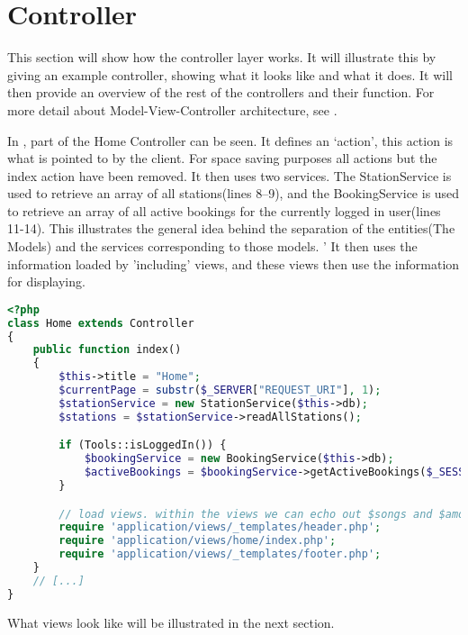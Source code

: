 \section{Controller}
This section will show how the controller layer works. 
It will illustrate this by giving an example controller, showing what it looks like and what it does.
It will then provide an overview of the rest of the controllers and their function.
For more detail about Model-View-Controller architecture, see .

In , part of the Home Controller can be seen. 
It defines an `action', this action is what is pointed to by the client. 
For space saving purposes all actions but the index action have been removed.
It then uses two services. 
The StationService is used to retrieve an array of all stations(lines 8--9), and the BookingService is used to retrieve an array of all active bookings for the currently logged in user(lines 11-14). 
This illustrates the general idea behind the separation of the entities(The Models) and the services corresponding to those models. '
It then uses the information loaded by 'including' views, and these views then use the information for displaying.

\begin{lstlisting}[language=php, label=lst:homeController, caption={Home Controller Class}]
<?php
class Home extends Controller
{
    public function index()
    {
        $this->title = "Home";
        $currentPage = substr($_SERVER["REQUEST_URI"], 1);
        $stationService = new StationService($this->db);
        $stations = $stationService->readAllStations();

        if (Tools::isLoggedIn()) {
            $bookingService = new BookingService($this->db);
            $activeBookings = $bookingService->getActiveBookings($_SESSION["login_user"]);
        }

        // load views. within the views we can echo out $songs and $amount_of_songs easily
        require 'application/views/_templates/header.php';
        require 'application/views/home/index.php';
        require 'application/views/_templates/footer.php';
    }
    // [...]
}
\end{lstlisting}



What views look like will be illustrated in the next section.